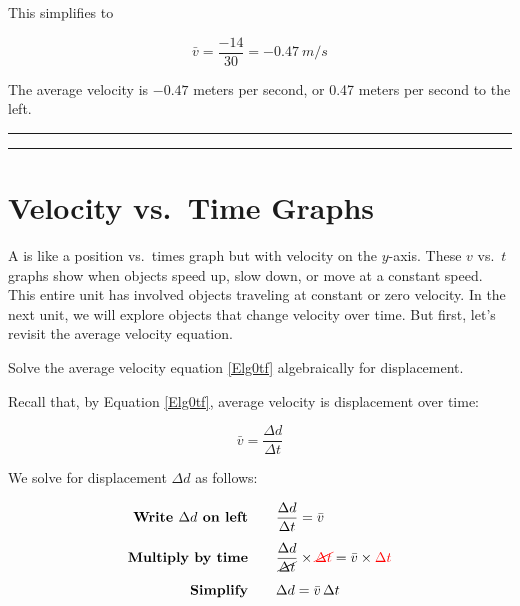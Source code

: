 \documentclass{article}
\begin{document}
This simplifies to

\begin{equation*}
    \bar{v} = \frac{-14}{30} = -\SI{0.47}{m/s}
\end{equation*}

The average velocity is $-0.47$ meters per second, or 0.47 meters per second to the left.


\vspace{1em}

\hrule





\hrule

\section{Velocity vs.~Time Graphs} \label{EOqf0D}

A  is like a position vs.~times graph but with velocity on the $y$-axis. These $v$ vs.~$t$ graphs show when objects speed up, slow down, or move at a constant speed. This entire unit has involved objects traveling at constant or zero velocity. In the next unit, we will explore objects that change velocity over time. But first, let's revisit the average velocity equation.

\begin{example}
    Solve the average velocity equation \eqref{Elg0tf} algebraically for displacement.
\end{example}

 Recall that, by Equation \eqref{Elg0tf}, average velocity is displacement over time:

\begin{equation*}
    \bar{v} = \frac{\Delta{d}}{\Delta{t}}
\end{equation*}

We solve for displacement $\Delta{d}$ as follows:

\begin{align*}
    \textbf{Write $\Delta{d}$ on left} \qquad & \frac{\Delta{d}}{\Delta{t}} = \bar{v}\\[1ex]
    \textbf{Multiply by time} \qquad & \frac{\Delta{d}}{\cancel{\Delta{t}}} \times \textcolor{red}{\cancel{\Delta{t}}} = \bar{v} \times \textcolor{red}{\Delta{t}}\\[1ex]
    \textbf{Simplify} \qquad & \Delta{d} = \bar{v}\,\Delta{t}
\end{align*}
\end{document}
